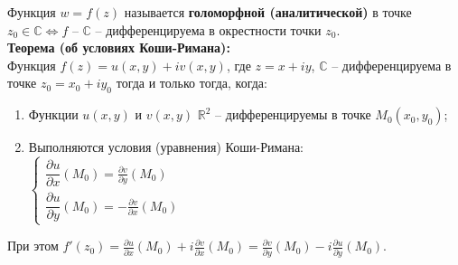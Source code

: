 Функция $w = f(z)$ называется \textbf{голоморфной (аналитической)} в точке $z_0 \in \mathbb{C} \Leftrightarrow f$ -- $\mathbb{C}$ -- дифференцируема в окрестности точки $z_0$.\\[2mm]
\textbf{Теорема (об условиях Коши-Римана):}\\[2mm]
Функция $f(z) = u(x, y) + iv(x, y)$, где $z = x + iy$, $\mathbb{C}$ -- дифференцируема в точке $z_0 = x_0 + iy_0$ тогда и только тогда, когда:
\begin{enumerate}
    \item Функции $u(x, y)$ и $v(x, y)$ $\mathbb{R}^2$ -- дифференцируемы в точке $M_0(x_0, y_0)$;
    \item Выполняются условия (уравнения) Коши-Римана:\\
    $\begin{cases}
        \dfrac{\partial u}{\partial x} (M_0) = \frac{\partial v}{\partial y} (M_0)\\
        \dfrac{\partial u}{\partial y} (M_0) = -\frac{\partial v}{\partial x} (M_0)
    \end{cases}$
\end{enumerate}
При этом $f'(z_0) = \frac{\partial u}{\partial x} (M_0) + i\frac{\partial v}{\partial x} (M_0) = \frac{\partial v}{\partial y} (M_0) - i\frac{\partial u}{\partial y} (M_0)$.
